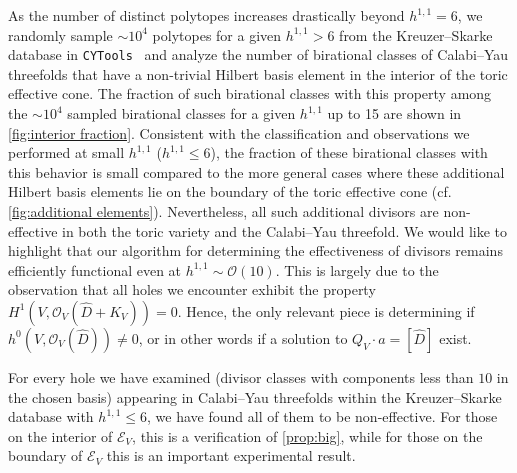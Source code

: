 \documentclass[11pt,dvipsnames]{article}
\theoremstyle{definition}
\newcommand{\cO}{\mathcal{O}}
\begin{document}
As the number of distinct polytopes increases drastically beyond $h^{1,1}=6$, we randomly sample $\sim 10^4$ polytopes for a given $h^{1,1}>6$ from the Kreuzer--Skarke database in \verb+CYTools+~\cite{Demirtas:2022hqf} and analyze the number of birational classes of Calabi--Yau threefolds that have a non-trivial Hilbert basis element in the interior of the toric effective cone. The fraction of such birational classes with this property among the $\sim 10^4$ sampled birational classes for a given $h^{1,1}$ up to 15 are shown in \cref{fig:interior fraction}. Consistent with the classification and observations we performed at small $h^{1,1}$ ($h^{1,1}\leq 6$), the fraction of these birational classes with this behavior is small compared to the more general cases where these additional Hilbert basis elements lie on the boundary of the toric effective cone (cf. \cref{fig:additional elements}). Nevertheless, all such additional divisors are non-effective in both the toric variety and the Calabi--Yau threefold. We would like to highlight that our algorithm for determining the effectiveness of divisors remains efficiently functional even at $h^{1,1}\sim \cO(10)$. This is largely due to the observation that all holes we encounter exhibit the property $H^1(V,\cO_V(\hat{D}+K_V))=0$. Hence, the only relevant piece is determining if $h^0(V,\cO_V(\hat{D}))\neq 0$, or in other words if a solution to $Q_V\cdot a=[\hat{D}]$ exist. 

For every hole we have examined (divisor classes with components less than $10$ in the chosen basis) appearing in Calabi--Yau threefolds within the Kreuzer--Skarke database with $h^{1,1}\leq 6$, we have found all of them to be non-effective. For those on the interior of $\mathcal{E}_V$, this is a verification of \cref{prop:big}, while for those on the boundary of $\mathcal{E}_V$ this is an important experimental result.
\end{document}
